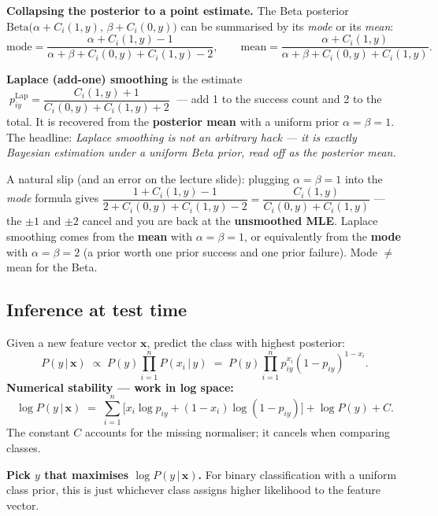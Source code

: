 \documentclass[11pt, a4paper]{article}
\begin{document}
\textbf{Collapsing the posterior to a point estimate.} The Beta posterior
$\text{Beta}\big(\alpha + C_i(1,y),\, \beta + C_i(0,y)\big)$ can be summarised by its \emph{mode} or its
\emph{mean}:
\[
\text{mode} = \frac{\alpha + C_i(1, y) - 1}{\alpha + \beta + C_i(0, y) + C_i(1, y) - 2}, \qquad
\text{mean} = \frac{\alpha + C_i(1, y)}{\alpha + \beta + C_i(0, y) + C_i(1, y)}.
\]

\textbf{Laplace (add-one) smoothing} is the estimate
$\;p_{iy}^{\text{Lap}} = \dfrac{C_i(1,y)+1}{C_i(0,y)+C_i(1,y)+2}\;$ — add 1 to the success count and 2
to the total. It is recovered from the \textbf{posterior mean} with a uniform prior
$\alpha=\beta=1$. The headline: \emph{Laplace smoothing is not an arbitrary hack — it is exactly
Bayesian estimation under a uniform Beta prior, read off as the posterior mean.}

\begin{trapbox}[: posterior \emph{mode} with $\alpha=\beta=1$ does \emph{not} give Laplace smoothing]
A natural slip (and an error on the lecture slide): plugging $\alpha=\beta=1$ into the \emph{mode}
formula gives $\dfrac{1 + C_i(1,y) - 1}{2 + C_i(0,y)+C_i(1,y) - 2} = \dfrac{C_i(1,y)}{C_i(0,y)+C_i(1,y)}$
— the $\pm1$ and $\pm2$ cancel and you are back at the \textbf{unsmoothed MLE}. Laplace smoothing
comes from the \textbf{mean} with $\alpha=\beta=1$, or equivalently from the \textbf{mode} with
$\alpha=\beta=2$ (a prior worth one prior success and one prior failure). Mode $\ne$ mean for the Beta.
\end{trapbox}

\subsection{Inference at test time}

Given a new feature vector $\mathbf{x}$, predict the class with highest posterior:
\[
P(y\,|\,\mathbf{x}) \;\propto\; P(y) \prod_{i=1}^n P(x_i\,|\,y) \;=\; P(y) \prod_{i=1}^n p_{iy}^{x_i}(1-p_{iy})^{1-x_i}.
\]
\textbf{Numerical stability — work in log space:}
\[
\log P(y\,|\,\mathbf{x}) \;=\; \sum_{i=1}^n \big[x_i\log p_{iy} + (1-x_i)\log(1-p_{iy})\big] + \log P(y) + C.
\]
The constant $C$ accounts for the missing normaliser; it cancels when comparing classes.

\textbf{Pick $y$ that maximises $\log P(y\,|\,\mathbf{x})$.} For binary classification with a uniform class prior, this is just whichever class assigns higher likelihood to the feature vector.

\end{document}
